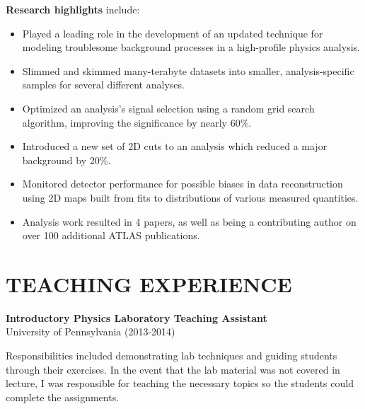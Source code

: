 \documentclass[10pt]{res}
\begin{document}
\begin{resume}

    {\bf Research highlights} include:
    \begin{itemize}
    \item Played a leading role in the development of an updated technique for modeling troublesome background processes in a high-profile physics analysis.
    \item Slimmed and skimmed many-terabyte datasets into smaller, analysis-specific samples for several different analyses.
    \item Optimized an analysis's signal selection using a random grid search algorithm, improving the significance by nearly 60\%.
    \item Introduced a new set of 2D cuts to an analysis which reduced a major background by 20\%.
    \item Monitored detector performance for possible biases in data reconstruction using 2D maps built from fits to distributions of various measured quantities.
    \item Analysis work resulted in 4 papers, as well as being a contributing author on over 100 additional ATLAS publications.
    \end{itemize}

\section{TEACHING EXPERIENCE}%
    {\bf Introductory Physics Laboratory Teaching Assistant}\\
    University of Pennsylvania (2013-2014)

    Responsibilities included demonstrating lab techniques and guiding students through their exercises.  In the event that the lab material was not covered in lecture, I was responsible for teaching the necessary topics so the students could complete the assignments.
\newpage

\end{resume}
\end{document}
